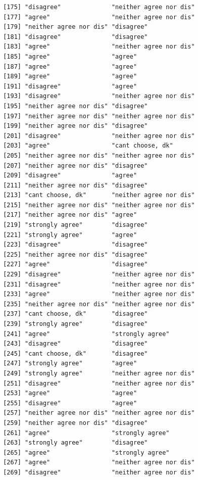 \documentclass{beamer}\usepackage[]{graphicx}\usepackage[]{color}
\makeatletter
\newenvironment{kframe}{%
 \def\at@end@of@kframe{}%
 \ifinner\ifhmode%
  \def\at@end@of@kframe{\end{minipage}}%
  \begin{minipage}{\columnwidth}%
 \fi\fi%
 \def\FrameCommand##1{\hskip\@totalleftmargin \hskip-\fboxsep
 \colorbox{shadecolor}{##1}\hskip-\fboxsep
     \hskip-\linewidth \hskip-\@totalleftmargin \hskip\columnwidth}%
 \MakeFramed {\advance\hsize-\width
   \@totalleftmargin\z@ \linewidth\hsize
   \@setminipage}}%
 {\par\unskip\endMakeFramed%
 \at@end@of@kframe}
\newenvironment{knitrout}{}{} %
\makeatother
\begin{document}
\begin{frame}[fragile]
\begin{knitrout}
\begin{kframe}
\begin{verbatim}
 [175] "disagree"              "neither agree nor dis"
 [177] "agree"                 "neither agree nor dis"
 [179] "neither agree nor dis" "disagree"             
 [181] "disagree"              "disagree"             
 [183] "agree"                 "neither agree nor dis"
 [185] "agree"                 "agree"                
 [187] "agree"                 "agree"                
 [189] "agree"                 "agree"                
 [191] "disagree"              "agree"                
 [193] "disagree"              "neither agree nor dis"
 [195] "neither agree nor dis" "disagree"             
 [197] "neither agree nor dis" "neither agree nor dis"
 [199] "neither agree nor dis" "disagree"             
 [201] "disagree"              "neither agree nor dis"
 [203] "agree"                 "cant choose, dk"      
 [205] "neither agree nor dis" "neither agree nor dis"
 [207] "neither agree nor dis" "disagree"             
 [209] "disagree"              "agree"                
 [211] "neither agree nor dis" "disagree"             
 [213] "cant choose, dk"       "neither agree nor dis"
 [215] "neither agree nor dis" "neither agree nor dis"
 [217] "neither agree nor dis" "agree"                
 [219] "strongly agree"        "disagree"             
 [221] "strongly agree"        "agree"                
 [223] "disagree"              "disagree"             
 [225] "neither agree nor dis" "disagree"             
 [227] "agree"                 "disagree"             
 [229] "disagree"              "neither agree nor dis"
 [231] "disagree"              "neither agree nor dis"
 [233] "agree"                 "neither agree nor dis"
 [235] "neither agree nor dis" "neither agree nor dis"
 [237] "cant choose, dk"       "disagree"             
 [239] "strongly agree"        "disagree"             
 [241] "agree"                 "strongly agree"       
 [243] "disagree"              "disagree"             
 [245] "cant choose, dk"       "disagree"             
 [247] "strongly agree"        "agree"                
 [249] "strongly agree"        "neither agree nor dis"
 [251] "disagree"              "neither agree nor dis"
 [253] "agree"                 "agree"                
 [255] "disagree"              "agree"                
 [257] "neither agree nor dis" "neither agree nor dis"
 [259] "neither agree nor dis" "disagree"             
 [261] "agree"                 "strongly agree"       
 [263] "strongly agree"        "disagree"             
 [265] "agree"                 "strongly agree"       
 [267] "agree"                 "neither agree nor dis"
 [269] "disagree"              "neither agree nor dis"

\end{verbatim}
\end{kframe}
\end{knitrout}
\end{frame}
\end{document}
